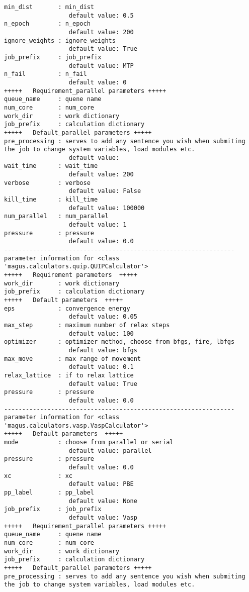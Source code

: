 \documentclass[12pt,oneside]{book}
\begin{document}
\begin{tcolorbox}
\begin{verbatim}
min_dist       : min_dist
                  default value: 0.5
n_epoch        : n_epoch
                  default value: 200
ignore_weights : ignore_weights
                  default value: True
job_prefix     : job_prefix
                  default value: MTP
n_fail         : n_fail
                  default value: 0
+++++	Requirement_parallel parameters	+++++
queue_name     : quene name
num_core       : num_core
work_dir       : work dictionary
job_prefix     : calculation dictionary
+++++	Default_parallel parameters	+++++
pre_processing : serves to add any sentence you wish when submiting the job to change system variables, load modules etc.
                  default value: 
wait_time      : wait_time
                  default value: 200
verbose        : verbose
                  default value: False
kill_time      : kill_time
                  default value: 100000
num_parallel   : num_parallel
                  default value: 1
pressure       : pressure
                  default value: 0.0
----------------------------------------------------------------
parameter information for <class 'magus.calculators.quip.QUIPCalculator'>
+++++	Requirement parameters	+++++
work_dir       : work dictionary
job_prefix     : calculation dictionary
+++++	Default parameters	+++++
eps            : convergence energy
                  default value: 0.05
max_step       : maximum number of relax steps
                  default value: 100
optimizer      : optimizer method, choose from bfgs, fire, lbfgs
                  default value: bfgs
max_move       : max range of movement
                  default value: 0.1
relax_lattice  : if to relax lattice
                  default value: True
pressure       : pressure
                  default value: 0.0
----------------------------------------------------------------
parameter information for <class 'magus.calculators.vasp.VaspCalculator'>
+++++	Default parameters	+++++
mode           : choose from parallel or serial
                  default value: parallel
pressure       : pressure
                  default value: 0.0
xc             : xc
                  default value: PBE
pp_label       : pp_label
                  default value: None
job_prefix     : job_prefix
                  default value: Vasp
+++++	Requirement_parallel parameters	+++++
queue_name     : quene name
num_core       : num_core
work_dir       : work dictionary
job_prefix     : calculation dictionary
+++++	Default_parallel parameters	+++++
pre_processing : serves to add any sentence you wish when submiting the job to change system variables, load modules etc.

\end{verbatim}
\end{tcolorbox}
\end{document}
